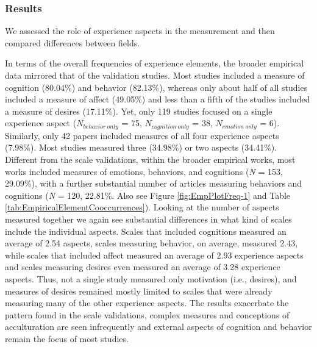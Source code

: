 \subsubsection{Results}

We assessed the role of experience aspects in the measurement and then
compared differences between fields.

In terms of the overall frequencies of experience elements, the broader
empirical data mirrored that of the validation studies. Most studies
included a measure of cognition (80.04\%) and behavior (82.13\%),
whereas only about half of all studies included a measure of affect
(49.05\%) and less than a fifth of the studies included a measure of
desires (17.11\%). Yet, only 119 studies focused on a single experience
aspect (\(N_{behavior\ only}\) = 75, \(N_{cognition\ only}\) = 38,
\(N_{emotion\ only}\) = 6). Similarly, only 42 papers included measures
of all four experience aspects (7.98\%). Most studies measured three
(34.98\%) or two aspects (34.41\%). Different from the scale
validations, within the broader empirical works, most works included
measures of emotions, behaviors, and cognitions (\textit{N} = 153,
29.09\%), with a further substantial number of articles measuring
behaviors and cognitions (\textit{N} = 120, 22.81\%. Also see Figure
\ref{fig:EmpPlotFreq-1} and Table
\ref{tab:EmpiricalElementCooccurrences}). Looking at the number of
aspects measured together we again see substantial differences in what
kind of scales include the individual aspects. Scales that included
cognitions measured an average of 2.54 aspects, scales measuring
behavior, on average, measured 2.43, while scales that included affect
measured an average of 2.93 experience aspects and scales measuring
desires even measured an average of 3.28 experience aspects. Thus, not a
single study measured only motivation (i.e., desires), and measures of
desires remained mostly limited to scales that were already measuring
many of the other experience aspects. The results exacerbate the pattern
found in the scale validations, complex measures and conceptions of
acculturation are seen infrequently and external aspects of cognition
and behavior remain the focus of most studies.

